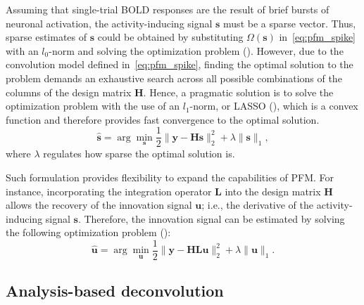 Assuming that single-trial BOLD responses are the result of brief bursts of neuronal activation, the activity-inducing signal \(\mathbf{s}\) must be a sparse vector. Thus, sparse estimates of \(\mathbf{s}\) could be obtained by substituting \(\Omega(\mathbf{s})\) in~\eqref{eq:pfm_spike} with an \(l_0\)-norm and solving the optimization problem (\citealt{bruckstein2009SparseSolutionsSystems}). However, due to the convolution model defined in~\eqref{eq:pfm_spike}, finding the optimal solution to the problem demands an exhaustive search across all possible combinations of the columns of the design matrix \(\mathbf{H}\). Hence, a pragmatic solution is to solve the optimization problem with the use of an \(l_1\)-norm, or LASSO (\citealt{tibshirani1996RegressionShrinkageSelection}), which is a convex function and therefore provides fast convergence to the optimal solution.
\begin{equation}
    \label{eq:pfm_spike}
    \hat{\mathbf{s}} = \arg \min_{\mathbf{s}} \frac{1}{2} \| \mathbf{y} - \mathbf{Hs} \|_2^2 + \lambda \| \mathbf{s} \|_1,
\end{equation}
where \(\lambda\) regulates how sparse the optimal solution is.

Such formulation provides flexibility to expand the capabilities of PFM. For instance, incorporating the integration operator \(\mathbf{L}\) into the design matrix \(\mathbf{H}\) allows the recovery of the innovation signal \(\mathbf{u}\); i.e., the derivative of the activity-inducing signal \(\mathbf{s}\). Therefore, the innovation signal can be estimated by solving the following optimization problem (\citealt{cherkaoui2019SparsitybasedBlindDeconvolution,urunuela2020StabilityBasedSparseParadigm}):
\begin{equation}
    \label{eq:pfm_block}
    \hat{\mathbf{u}} = \arg \min_{\mathbf{u}} \frac{1}{2} \| \mathbf{y} - \mathbf{HLu} \|_2^2 + \lambda \| \mathbf{u} \|_1.
\end{equation}


\subsection{Analysis-based deconvolution}

